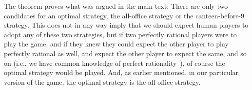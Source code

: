 The theorem proves what was argued in the main text: There are only two candidates for an optimal strategy, the all-office strategy or the canteen-before-9 strategy. This does not in any way imply that we should expect human players to adopt any of these two strategies, but if two perfectly rational players were to play the game, and if they knew they could expect the other player to play perfectly rational as well, and expect the other player to expect the same, and so on (i.e., we have common knowledge of perfect rationality~\cite{aumann1995backward}),
of course the optimal strategy would be played. And, as earlier mentioned, in our particular version of the game, the optimal strategy is the all-office strategy.










